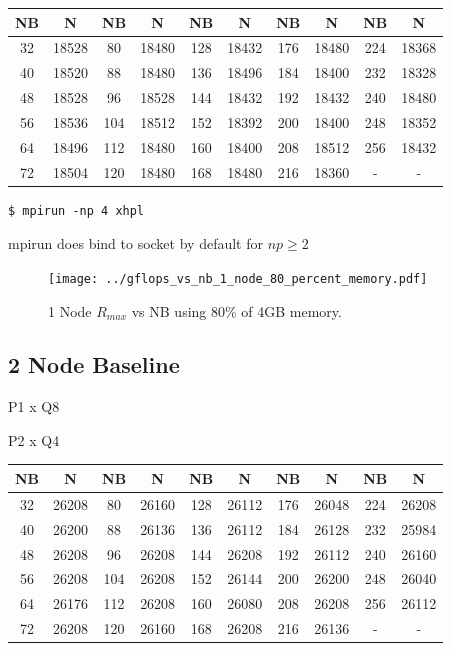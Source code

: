 \documentclass{article}
\begin{document}
\begin{center}
	\begin{tabular}{ |c|c|c|c|c|c|c|c|c|c| } 
		\hline
		NB & N & NB & N & NB & N & NB & N & NB & N \\ 
		\hline
		32 & 18528 &  80 & 18480 & 128 & 18432 & 176 & 18480 & 224 & 18368 \\ 
		40 & 18520 &  88 & 18480 & 136 & 18496 & 184 & 18400 & 232 & 18328 \\ 
 		48 & 18528 &  96 & 18528 & 144 & 18432 & 192 & 18432 & 240 & 18480 \\
		56 & 18536 & 104 & 18512 & 152 & 18392 & 200 & 18400 & 248 & 18352 \\ 
 		64 & 18496 & 112 & 18480 & 160 & 18400 & 208 & 18512 & 256 & 18432 \\
		72 & 18504 & 120 & 18480 & 168 & 18480 & 216 & 18360 &   - &     - \\ 
 		\hline
	\end{tabular}
\end{center}

\lstset{style=termstyle}
\begin{lstlisting}[]
$ mpirun -np 4 xhpl
\end{lstlisting}

mpirun does bind to socket by default for $np \geq 2$

\begin{figure}
	\centering	
	\texttt{[image: ../gflops\_vs\_nb\_1\_node\_80\_percent\_memory.pdf]}
	\caption{1 Node $R_{max}$ vs NB using 80\% of 4GB memory.}
\end{figure}



\subsection{2 Node Baseline}

P1 x Q8

P2 x Q4

\begin{center}
	\begin{tabular}{ |c|c|c|c|c|c|c|c|c|c| } 
		\hline
		NB & N & NB & N & NB & N & NB & N & NB & N \\ 
		\hline
		32 & 26208 &   80 & 26160 & 128 & 26112 & 176 & 26048 & 224 & 26208 \\ 
		40 & 26200 &   88 & 26136 & 136 & 26112 & 184 & 26128 & 232 & 25984 \\ 
 		48 & 26208 &   96 & 26208 & 144 & 26208 & 192 & 26112 & 240 & 26160 \\
		56 & 26208 & 104 & 26208 & 152 & 26144 & 200 & 26200 & 248 & 26040 \\ 
 		64 & 26176 & 112 & 26208 & 160 & 26080 & 208 & 26208 & 256 & 26112 \\
		72 & 26208 & 120 & 26160 & 168 & 26208 & 216 & 26136 &     - &         - \\ 
 		\hline
	\end{tabular}
\end{center}
\end{document}

